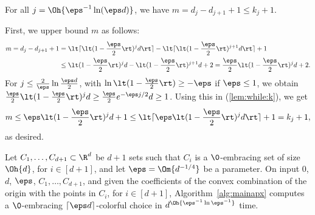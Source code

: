 \begin{lemma}\label{lem:while}
  For all $j = \Oh{\eps^{-1} \ln (\eps d)}$, we have 
  $m = d_j - d_{j+1} + 1 \leq k_j + 1$.
\end{lemma}
\begin{prf}
  First, we upper bound $m$ as follows:
\begin{equation}\label{lem:while:k}
  \begin{split}
    m = d_j - d_{j+1} + 1
    & = \lt\lceil \lt(1-\frac{\eps}{2}\rt)^j d \rt\rceil
        - \lt\lceil \lt(1-\frac{\eps}{2}\rt)^{j+1} d \rt\rceil + 1
    \\
    & \leq \lt(1-\frac{\eps}{2}\rt)^j d - 
    \lt(1-\frac{\eps}{2}\rt)^{j+1} d + 2
    = \frac{\eps}{2} \lt(1-\frac{\eps}{2}\rt)^j d + 2.
  \end{split}
\end{equation}
For $j \leq  \frac{2}{\eps} \ln \frac{\eps d}{2}$, 
with $\ln\lt(1-\frac{\eps}{2}\rt) \geq -\eps$ if 
$\eps \leq 1$,
we obtain $\frac{\eps}{2}
\lt(1-\frac{\eps}{2}\rt)^j d \geq \frac{\eps}{2} e^{-\eps j/2}d \geq 1$. 
Using this in (\ref{lem:while:k}), we get
\begin{equation*}
    m
  \leq \eps \lt(1-\frac{\eps}{2}\rt)^j d + 1
  \leq \lt\lceil \eps \lt(1-\frac{\eps}{2}\rt)^j d \rt\rceil + 1 = k_j + 1,
\end{equation*}
as desired.
\end{prf}

\begin{theorem}
\label{thm:bapx}
  Let $C_1, \ldots, C_{d+1}\subset \R^d$ be
  $d+1$ sets such that $C_i$ is a $\0$-embracing set
  of size $\Oh{d}$, for $i \in [d+1]$, and let $\eps = \Om{d^{-1/4}}$ be a
  parameter. On input $0$, $d$, $\eps$, $C_1,\dots,C_{d+1}$, and given the
  coefficients of the convex combination of the origin with the points 
  in $C_i$, for $i \in [d+1]$,
  Algorithm~\ref{alg:mainapx} computes a $\0$-embracing 
  $\lceil \eps d\rceil$-colorful
  choice in $d^{\Oh{\eps^{-1} \ln \eps^{-1}}}$ time.
\end{theorem}

